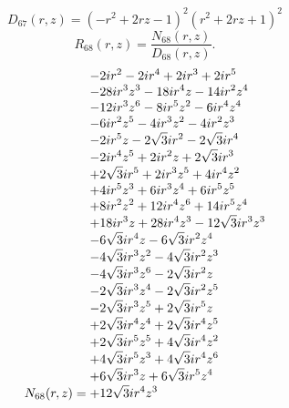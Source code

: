 \documentclass[11pt,a4paper]{article}
\begin{document}
\begin{equation}
D_{67}(r,z)=\left(- r^{2} + 2 r z - 1\right)^{2} \left(r^{2} + 2 r z + 1\right)^{2}
\label{eq:cat-denominator-67}
\end{equation}
\begin{equation}
R_{68}(r,z)=\frac{N_{68}(r,z)}{D_{68}(r,z)}.
\label{eq:cat-rational-68}
\end{equation}
\begin{equation}
N_{68}(r,z)=\shortstack[l]{$\displaystyle  - 2 i r^{2} - 2 i r^{4} + 2 i r^{3} + 2 i r^{5}$\\
$\displaystyle  - 28 i r^{3} z^{3} - 18 i r^{4} z - 14 i r^{2} z^{4}$\\
$\displaystyle  - 12 i r^{3} z^{6} - 8 i r^{5} z^{2} - 6 i r^{4} z^{4}$\\
$\displaystyle  - 6 i r^{2} z^{5} - 4 i r^{3} z^{2} - 4 i r^{2} z^{3}$\\
$\displaystyle  - 2 i r^{5} z - 2 \sqrt{3} i r^{2} - 2 \sqrt{3} i r^{4}$\\
$\displaystyle  - 2 i r^{4} z^{5} + 2 i r^{2} z + 2 \sqrt{3} i r^{3}$\\
$\displaystyle  + 2 \sqrt{3} i r^{5} + 2 i r^{3} z^{5} + 4 i r^{4} z^{2}$\\
$\displaystyle  + 4 i r^{5} z^{3} + 6 i r^{3} z^{4} + 6 i r^{5} z^{5}$\\
$\displaystyle  + 8 i r^{2} z^{2} + 12 i r^{4} z^{6} + 14 i r^{5} z^{4}$\\
$\displaystyle  + 18 i r^{3} z + 28 i r^{4} z^{3} - 12 \sqrt{3} i r^{3} z^{3}$\\
$\displaystyle  - 6 \sqrt{3} i r^{4} z - 6 \sqrt{3} i r^{2} z^{4}$\\
$\displaystyle  - 4 \sqrt{3} i r^{3} z^{2} - 4 \sqrt{3} i r^{2} z^{3}$\\
$\displaystyle  - 4 \sqrt{3} i r^{3} z^{6} - 2 \sqrt{3} i r^{2} z$\\
$\displaystyle  - 2 \sqrt{3} i r^{3} z^{4} - 2 \sqrt{3} i r^{2} z^{5}$\\
$\displaystyle  - 2 \sqrt{3} i r^{3} z^{5} + 2 \sqrt{3} i r^{5} z$\\
$\displaystyle  + 2 \sqrt{3} i r^{4} z^{4} + 2 \sqrt{3} i r^{4} z^{5}$\\
$\displaystyle  + 2 \sqrt{3} i r^{5} z^{5} + 4 \sqrt{3} i r^{4} z^{2}$\\
$\displaystyle  + 4 \sqrt{3} i r^{5} z^{3} + 4 \sqrt{3} i r^{4} z^{6}$\\
$\displaystyle  + 6 \sqrt{3} i r^{3} z + 6 \sqrt{3} i r^{5} z^{4}$\\
$\displaystyle  + 12 \sqrt{3} i r^{4} z^{3}$}
\label{eq:cat-numerator-68}
\end{equation}
\end{document}
